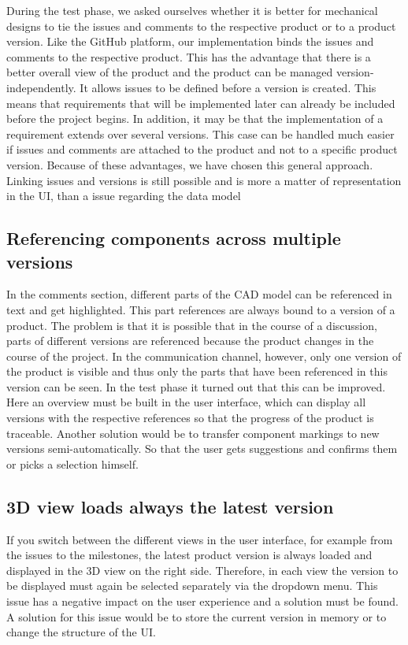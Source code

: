 During the test phase, we asked ourselves whether it is better for mechanical designs to tie the issues and comments to the respective product or to a product version. Like the GitHub platform, our implementation binds the issues and comments to the respective product. This has the advantage that there is a better overall view of the product and the product can be managed version-independently. It allows issues to be defined before a version is created. This means that requirements that will be implemented later can already be included before the project begins. In addition, it may be that the implementation of a requirement extends over several versions. This case can be handled much easier if issues and comments are attached to the product and not to a specific product version.
Because of these advantages, we have chosen this general approach. Linking issues and versions is still possible and is more a matter of representation in the UI, than a issue regarding the data model

\subsection*{Referencing components across multiple versions}

In the comments section, different parts of the CAD model can be referenced in text and get highlighted. This part references are always bound to a version of a product. The problem is that it is possible that in the course of a discussion, parts of different versions are referenced because the product changes in the course of the project. In the communication channel, however, only one version of the product is visible and thus only the parts that have been referenced in this version can be seen. In the test phase it turned out that this can be improved. Here an overview must be built in the user interface, which can display all versions with the respective references so that the progress of the product is traceable. Another solution would be to transfer component markings to new versions semi-automatically. So that the user gets suggestions and confirms them or picks a selection himself.

\subsection*{3D view loads always the latest version}

If you switch between the different views in the user interface, for example from the issues to the milestones, the latest product version is always loaded and displayed in the 3D view on the right side. Therefore, in each view the version to be displayed must again be selected separately via the dropdown menu. This issue has a negative impact on the user experience and a solution must be found.
A solution for this issue would be to store the current version in memory or to change the structure of the UI.

